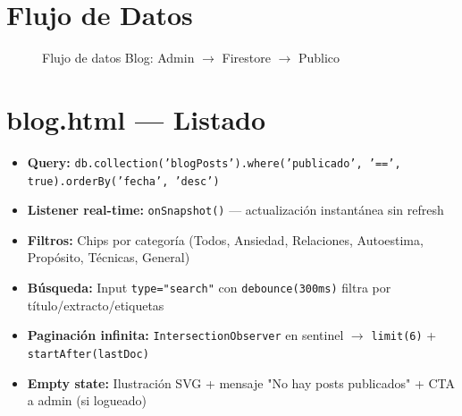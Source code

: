 \documentclass[12pt,a4paper,spanish]{report}
\begin{document}
\section{Flujo de Datos}
\begin{figure}[H]
    \centering
    \caption{Flujo de datos Blog: Admin $\rightarrow$ Firestore $\rightarrow$ Publico}
    \label{fig:blog-flow}
\end{figure}

\section{blog.html — Listado}
\begin{itemize}
    \item \textbf{Query:} \texttt{db.collection('blogPosts').where('publicado', '==', true).orderBy('fecha', 'desc')}
    \item \textbf{Listener real-time:} \texttt{onSnapshot()} — actualización instantánea sin refresh
    \item \textbf{Filtros:} Chips por categoría (Todos, Ansiedad, Relaciones, Autoestima, Propósito, Técnicas, General)
    \item \textbf{Búsqueda:} Input \texttt{type="search"} con \texttt{debounce(300ms)} filtra por título/extracto/etiquetas
    \item \textbf{Paginación infinita:} \texttt{IntersectionObserver} en sentinel $\rightarrow$ \texttt{limit(6)} + \texttt{startAfter(lastDoc)}
    \item \textbf{Empty state:} Ilustración SVG + mensaje "No hay posts publicados" + CTA a admin (si logueado)
\end{itemize}
\end{document}
